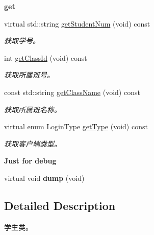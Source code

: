 \begin{Indent}{\bf get}\par
\begin{DoxyCompactItemize}
\item 
virtual std\-::string \hyperlink{classepStudent_ae0e95d9e1b1ff6cf62caaddf1c05b3ae}{get\-Student\-Num} (void) const 
\begin{DoxyCompactList}\small\item\em 获取学号。 \end{DoxyCompactList}\item 
int \hyperlink{classepStudent_a95b80c7d6d1255e9a89f6245cf2080c5}{get\-Class\-Id} (void) const 
\begin{DoxyCompactList}\small\item\em 获取所属班号。 \end{DoxyCompactList}\item 
const std\-::string \hyperlink{classepStudent_a4b6cff6cfdb361771c5fa4aaf6205aee}{get\-Class\-Name} (void) const 
\begin{DoxyCompactList}\small\item\em 获取所属班名称。 \end{DoxyCompactList}\item 
virtual enum \-Login\-Type \hyperlink{classepStudent_a8e546f0eaa7eb386bacd6f9afe390d69}{get\-Type} (void) const 
\begin{DoxyCompactList}\small\item\em 获取客户端类型。 \end{DoxyCompactList}\end{DoxyCompactItemize}
\end{Indent}
\begin{Indent}{\bf \-Just for debug}\par
\begin{DoxyCompactItemize}
\item 
\hypertarget{classepStudent_ad0b93f4ddbd6fce37391f8eb00418c15}{virtual void {\bfseries dump} (void)}\label{classepStudent_ad0b93f4ddbd6fce37391f8eb00418c15}

\end{DoxyCompactItemize}
\end{Indent}


\subsection{\-Detailed \-Description}
学生类。 


